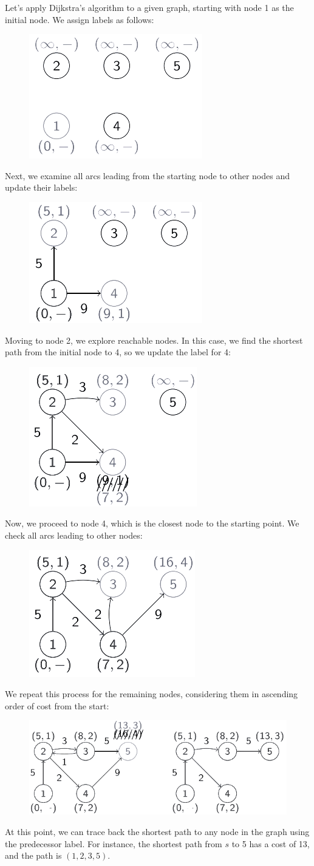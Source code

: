 \documentclass[12pt, a4paper]{report}
\begin{document}
    \begin{example}
        Let's apply Dijkstra's algorithm to a given graph, starting with node 1 as the initial node. 
        We assign labels as follows:
        \begin{figure}[H]
            \centering
            \includegraphics[width=0.2\linewidth]{images/D1.png}
        \end{figure}
        Next, we examine all arcs leading from the starting node to other nodes and update their labels:
        \begin{figure}[H]
            \centering
            \includegraphics[width=0.2\linewidth]{images/D2.png}
        \end{figure}
        Moving to node 2, we explore reachable nodes. 
        In this case, we find the shortest path from the initial node to 4, so we update the label for 4:
        \begin{figure}[H]
            \centering
            \includegraphics[width=0.2\linewidth]{images/D3.png}
        \end{figure}
        Now, we proceed to node 4, which is the closest node to the starting point.
         We check all arcs leading to other nodes:
        \begin{figure}[H]
            \centering
            \includegraphics[width=0.2\linewidth]{images/D4.png}
        \end{figure}
        We repeat this process for the remaining nodes, considering them in ascending order of cost from the start:
        \begin{figure}[H]
            \centering
            \includegraphics[width=0.4\linewidth]{images/D5.png}
        \end{figure}
        At this point, we can trace back the shortest path to any node in the graph using the predecessor label. 
        For instance, the shortest path from $s$ to 5 has a cost of 13, and the path is $(1,2,3,5)$. 
    \end{example}
\end{document}
